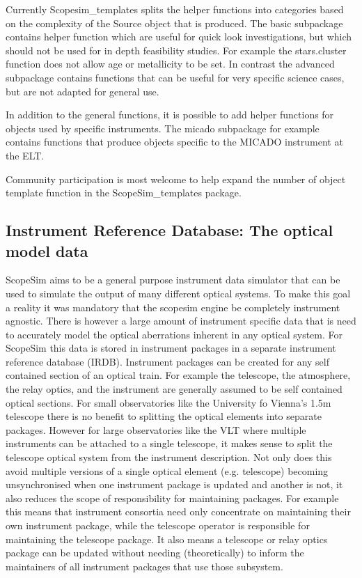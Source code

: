 Currently Scopesim\_templates splits the helper functions into categories based on the complexity of the Source object that is produced.
The \textquotedbl{}basic\textquotedbl{} subpackage contains helper function which are useful for quick look investigations, but which should not be used for in depth feasibility studies.
For example the \textquotedbl{}stars.cluster\textquotedbl{} function does not allow age or metallicity to be set.
In contrast the \textquotedbl{}advanced\textquotedbl{} subpackage contains functions that can be useful for very specific science cases, but are not adapted for general use.

In addition to the general functions, it is possible to add helper functions for objects used by specific instruments.
The \textquotedbl{}micado\textquotedbl{} subpackage for example contains functions that produce objects specific to the MICADO instrument at the ELT.

Community participation is most welcome to help expand the number of object template function in the ScopeSim\_templates package.


\subsection{Instrument Reference Database: The optical model data%
  \label{instrument-reference-database-the-optical-model-data}%
}

ScopeSim aims to be a general purpose instrument data simulator that can be used to simulate the output of many different optical systems.
To make this goal a reality it was mandatory that the scopesim engine be completely instrument agnostic.
There is however a large amount of instrument specific data that is need to accurately model the optical aberrations inherent in any optical system.
For ScopeSim this data is stored in instrument packages in a separate instrument reference database (IRDB).
Instrument packages can be created for any self contained section of an optical train.
For example the telescope, the atmosphere, the relay optics, and the instrument are generally assumed to be self contained optical sections.
For small observatories like the University fo Vienna's 1.5m telescope there is no benefit to splitting the optical elements into separate packages.
However for large observatories like the VLT where multiple instruments can be attached to a single telescope, it makes sense to split the telescope optical system from the instrument description.
Not only does this avoid multiple versions of a single optical element (e.g. telescope) becoming unsynchronised when one instrument package is updated and another is not, it also reduces the scope of responsibility for maintaining packages.
For example this means that instrument consortia need only concentrate on maintaining their own instrument package, while the telescope operator is responsible for maintaining the telescope package.
It also means a telescope or relay optics package can be updated without needing (theoretically) to inform the maintainers of all instrument packages that use those subsystem.


